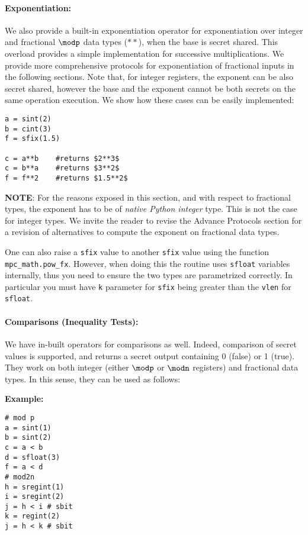 \paragraph{Exponentiation:}
We also provide a built-in exponentiation operator for exponentiation over integer and 
fractional $\modp$ data types ($**$), when the base is secret shared. 
This overload provides a simple implementation for successive multiplications. 
We provide more comprehensive protocols for exponentiation of fractional inputs 
in the following sections. 
Note that, for integer registers, the exponent can be also secret shared, 
however the base and the exponent cannot be both secrets on the same operation execution. 
We show how these cases can be easily implemented: 
\begin{lstlisting}
a = sint(2)
b = cint(3)
f = sfix(1.5)

c = a**b 	#returns $2**3$
c = b**a 	#returns $3**2$
f = f**2	#returns $1.5**2$
\end{lstlisting}
\textbf{NOTE}: For the reasons exposed in this section, and with respect to fractional types, 
the exponent has to be of \textit{native Python integer} type. 
This is not the case for integer types. We invite the reader to revise the Advance Protocols 
section for a revision of alternatives to compute the exponent on fractional data types.

One can also raise a \verb|sfix| value to another \verb|sfix| value using the 
function \verb|mpc_math.pow_fx|. However, when doing this the routine uses 
\verb|sfloat| variables internally, thus you need to ensure the two types
are parametrized correctly.
In particular you must have \verb|k| parameter for \verb|sfix| being greater than
the \verb|vlen| for \verb|sfloat|.

\paragraph{Comparisons (Inequality Tests):}
We have in-built operators for comparisons as well. 
Indeed, comparison of secret values is supported, 
and returns a secret output containing 0 (false) or 1 (true).
They work on both integer (either $\modp$ or $\modn$ registers) and fractional data types. 
In this sense, they can be used as follows: 

\noindent
\textbf{Example:}
\begin{lstlisting}
# mod p
a = sint(1)
b = sint(2)
c = a < b
d = sfloat(3)
f = a < d
# mod2n
h = sregint(1)
i = sregint(2)
j = h < i # sbit     
k = regint(2)
j = h < k # sbit     
\end{lstlisting}

